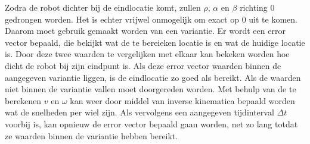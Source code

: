 \documentclass[a4paper]{article}
\begin{document}
Zodra de robot dichter bij de eindlocatie komt, zullen $\rho$, $\alpha$ en $\beta$ richting $0$ gedrongen worden. Het is echter vrijwel onmogelijk om exact op $0$ uit te komen. Daarom moet gebruik gemaakt worden van een variantie. Er wordt een error vector bepaald, die bekijkt wat de te bereieken locatie is en wat de huidige locatie is. Door deze twee waarden te vergelijken met elkaar kan bekeken worden hoe dicht de robot bij zijn eindpunt is. Als deze error vector waarden binnen de aangegeven variantie liggen, is de eindlocatie zo goed als bereikt. Als de waarden niet binnen de variantie vallen moet doorgereden worden. Met behulp van de te berekenen $v$ en $\omega$ kan weer door middel van inverse kinematica bepaald worden wat de snelheden per wiel zijn. Als vervolgens een aangegeven tijdinterval $\Delta t$ voorbij is, kan opnieuw de error vector bepaald gaan worden, net zo lang totdat ze waarden binnen de variantie hebben bereikt.
\end{document}
